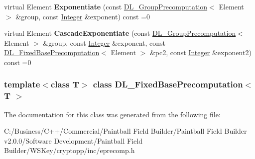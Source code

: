 \begin{DoxyCompactItemize}
\item 
\hypertarget{class_d_l___fixed_base_precomputation_ac11f5d82936a1e62395230aba2a34ae4}{
virtual Element {\bfseries Exponentiate} (const \hyperlink{class_d_l___group_precomputation}{DL\_\-GroupPrecomputation}$<$ Element $>$ \&group, const \hyperlink{class_integer}{Integer} \&exponent) const =0}
\label{class_d_l___fixed_base_precomputation_ac11f5d82936a1e62395230aba2a34ae4}

\item 
\hypertarget{class_d_l___fixed_base_precomputation_a064dde74fe2ac37359c0928494cd9d7e}{
virtual Element {\bfseries CascadeExponentiate} (const \hyperlink{class_d_l___group_precomputation}{DL\_\-GroupPrecomputation}$<$ Element $>$ \&group, const \hyperlink{class_integer}{Integer} \&exponent, const \hyperlink{class_d_l___fixed_base_precomputation}{DL\_\-FixedBasePrecomputation}$<$ Element $>$ \&pc2, const \hyperlink{class_integer}{Integer} \&exponent2) const =0}
\label{class_d_l___fixed_base_precomputation_a064dde74fe2ac37359c0928494cd9d7e}

\end{DoxyCompactItemize}
\subsubsection*{template$<$class T$>$ class DL\_\-FixedBasePrecomputation$<$ T $>$}



The documentation for this class was generated from the following file:\begin{DoxyCompactItemize}
\item 
C:/Business/C++/Commercial/Paintball Field Builder/Paintball Field Builder v2.0.0/Software Development/Paintball Field Builder/WSKey/cryptopp/inc/eprecomp.h\end{DoxyCompactItemize}
